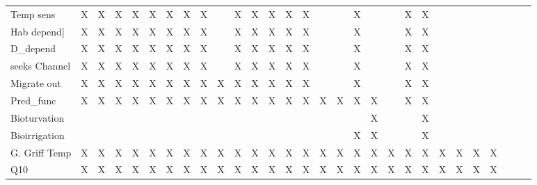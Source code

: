 \documentclass[11pt]{article}
\begin{document}
\begin{center}
\begin{tabular}{lllllllllllllllllllllllllllll}
 Temp sens           &  X    &  X    &  X    &  X    &  X    &  X    &  X    &  X    &       &  X    &  X    &  X    &  X    &  X    &       &       &  X    &       &       &  X    &  X    &      &      &       &       &      &      &      \\
 Hab depend]         &  X    &  X    &  X    &  X    &  X    &  X    &  X    &  X    &       &  X    &  X    &  X    &  X    &  X    &       &       &  X    &       &       &  X    &  X    &      &      &       &       &      &      &      \\
 D_depend            &  X    &  X    &  X    &  X    &  X    &  X    &  X    &  X    &       &  X    &  X    &  X    &  X    &  X    &       &       &  X    &       &       &  X    &  X    &      &      &       &       &      &      &      \\
 seeks Channel       &  X    &  X    &  X    &  X    &  X    &  X    &  X    &  X    &       &  X    &  X    &  X    &  X    &  X    &       &       &  X    &       &       &  X    &  X    &      &      &       &       &      &      &      \\
 Migrate out         &  X    &  X    &  X    &  X    &  X    &  X    &  X    &  X    &  X    &  X    &  X    &  X    &  X    &  X    &       &       &  X    &       &       &  X    &  X    &      &      &       &       &      &      &      \\
 Pred_func           &  X    &  X    &  X    &  X    &  X    &  X    &  X    &  X    &  X    &  X    &  X    &  X    &  X    &  X    &  X    &  X    &  X    &  X    &       &  X    &  X    &      &      &       &       &      &      &      \\
 Bioturvation        &       &       &       &       &       &       &       &       &       &       &       &       &       &       &       &       &       &  X    &       &       &  X    &      &      &       &       &      &      &      \\
 Bioirrigation       &       &       &       &       &       &       &       &       &       &       &       &       &       &       &       &       &  X    &  X    &       &       &  X    &      &      &       &       &      &      &      \\
 G. Griff Temp       &  X    &  X    &  X    &  X    &  X    &  X    &  X    &  X    &  X    &  X    &  X    &  X    &  X    &  X    &  X    &  X    &  X    &  X    &  X    &  X    &  X    &  X   &  X   &  X    &  X    &      &      &      \\
 Q10                 &  X    &  X    &  X    &  X    &  X    &  X    &  X    &  X    &  X    &  X    &  X    &  X    &  X    &  X    &  X    &  X    &  X    &  X    &  X    &  X    &  X    &  X   &  X   &  X    &  X    &      &      &      \\

\end{tabular}
\end{center}
\end{document}
